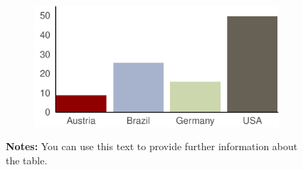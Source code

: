 \documentclass[12pt,a4paper,oneside]{article} %
\begin{document}
\begin{figure}

\caption{\label{fig-barchart}Number of Federal States by Country}

{\centering 

\begin{figure}[H]

{\centering \includegraphics{example_paper_files/figure-pdf/Barchart-1.pdf}

}

\end{figure}

\hypertarget{fig-barchart-1}{}
\vspace{-5pt}
\begin{minipage}{0.9\textwidth}
\scriptsize
\singlespacing
\textbf{Notes:} You can use this text to provide further information about the table. \lipsum[66]
\end{minipage}
\vspace{15pt}

}

\end{figure}

\lipsum[1-2]
\end{document}
